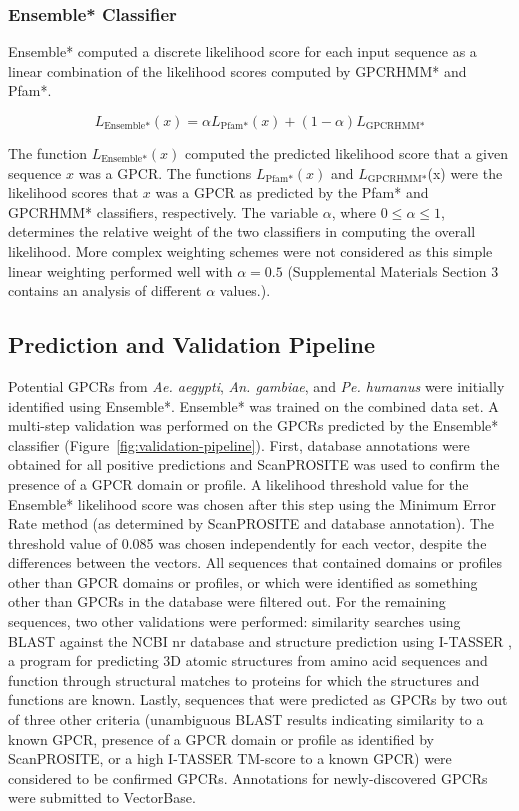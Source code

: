 \subsubsection*{Ensemble* Classifier}
Ensemble* computed a discrete likelihood score for each input sequence as a linear combination of the likelihood scores computed by GPCRHMM* and Pfam*.

\begin{equation*}
L_{\text{Ensemble*}}(x) = \alpha L_{\text{Pfam*}}(x) + (1 - \alpha) L_{\text{GPCRHMM*}}
\end{equation*}

The function $L_{\text{Ensemble*}}(x)$ computed the predicted likelihood score that a given sequence $x$ was a GPCR. The functions $L_{\text{Pfam*}}(x)$ and $L_{\text{GPCRHMM*}}$(x) were the likelihood scores that $x$ was a GPCR as predicted by the Pfam* and GPCRHMM* classifiers, respectively. The variable $\alpha$, where $0 \le \alpha \le 1$, determines the relative weight of the two classifiers in computing the overall likelihood. More complex weighting schemes were not considered as this simple linear weighting performed well with $\alpha = 0.5$ (Supplemental Materials Section 3 contains an analysis of different $\alpha$ values.).

\subsection*{Prediction and Validation Pipeline}
Potential GPCRs from \emph{Ae. aegypti}, \emph{An. gambiae}, and \emph{Pe. humanus} were initially identified using Ensemble*.  Ensemble* was trained on the combined data set.  A multi-step validation was performed on the GPCRs predicted by the Ensemble* classifier (Figure~\ref{fig:validation-pipeline}). First, database annotations were obtained for all positive predictions and ScanPROSITE \cite{Gattiker2002} was used to confirm the presence of a GPCR domain or profile. A likelihood threshold value for the Ensemble* likelihood score was chosen after this step using the Minimum Error Rate method \cite{Wistrand2006} (as determined by ScanPROSITE and database annotation). The threshold value of 0.085 was chosen independently for each vector, despite the differences between the vectors. All sequences that contained domains or profiles other than GPCR domains or profiles, or which were identified as something other than GPCRs in the database were filtered out. For the remaining sequences, two other validations were performed: similarity searches using BLAST against the NCBI nr database \cite{Pruitt2007} and structure prediction using I-TASSER \cite{Zhang2007, Roy2010}, a program for predicting 3D atomic structures from amino acid sequences and function through structural matches to proteins for which the structures and functions are known.  Lastly, sequences that were predicted as GPCRs by two out of three other criteria (unambiguous BLAST results indicating similarity to a known GPCR, presence of a GPCR domain or profile as identified by ScanPROSITE, or a high I-TASSER TM-score to a known GPCR) were considered to be confirmed GPCRs. Annotations for newly-discovered GPCRs were submitted to VectorBase.

